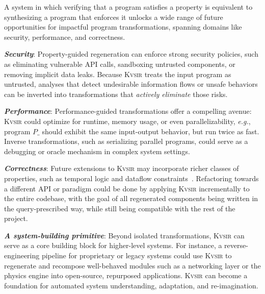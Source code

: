 \documentclass[sigplan,review,anonymous,10pt]{acmart}
\def\eg{{\em e.g.}, }
\newcommand{\sys}{{\scshape Kv{\textalpha}sir}\xspace}
\newcommand{\heading}[1]{\vspace{2pt}\noindent\textbf{\emph{#1}}:\enspace}
\begin{document}

A system in which verifying that a program satisfies a property is equivalent
to synthesizing a program that enforces it unlocks a wide range of future
opportunities for impactful program transformations, spanning domains like security,
performance, and correctness.

\heading{Security}
Property-guided regeneration can enforce strong security 
policies, such as eliminating vulnerable API calls, sandboxing 
untrusted components, or removing implicit data leaks. 
Because \sys treats the input program as untrusted, 
analyses that detect undesirable information flows or unsafe 
behaviors can be inverted into transformations that 
\emph{actively eliminate} those risks.

\heading{Performance}
Performance-guided transformations offer a compelling avenue: \sys
could optimize for runtime, memory usage, or even parallelizability, \eg
program $P\_$ should exhibit the same input-output behavior, but run twice as fast.
Inverse
transformations, such as serializing parallel programs, could serve as
a debugging or oracle mechanism in complex system settings.

\heading{Correctness}
Future extensions to \sys may incorporate richer classes of properties, such as
temporal logic and dataflow
constraints~\cite{azzopardi2023ltl,handa2021orderawaredataflowmodelparallel}.
Refactoring towards a different API or paradigm could be done by applying 
\sys incrementally to the entire codebase, with the goal of all regenerated 
components being written in the query-prescribed way, while still being compatible 
with the rest of the project.

\heading{A system-building primitive}
Beyond isolated transformations, \sys can serve as a core building block for
higher-level systems.
For instance, a reverse-engineering pipeline for
proprietary or legacy systems could use \sys to regenerate and recompose
well-behaved modules such as a networking layer or the physics engine into open-source,
repurposed applications.
\sys can become a foundation for automated system understanding, adaptation, and re-imagination.


\end{document}
